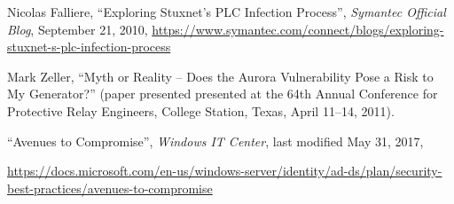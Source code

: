 \documentclass[10pt]{article}
\begin{document}
\begin{thebibliography}{9}
{    
    Nicolas Falliere, ``Exploring Stuxnet's PLC Infection Process'', \textit{Symantec Official Blog}, September 21, 2010, \url{https://www.symantec.com/connect/blogs/exploring-stuxnet-s-plc-infection-process}
    
    Mark Zeller, ``Myth or Reality – Does the Aurora Vulnerability Pose a Risk to My Generator?'' (paper presented presented at the 64th Annual Conference for Protective Relay Engineers, College Station, Texas, April 11–14, 2011). 
    
    ``Avenues to Compromise'', \textit{Windows IT Center}, last modified May 31, 2017, 
    
    \url{https://docs.microsoft.com/en-us/windows-server/identity/ad-ds/plan/security-best-practices/avenues-to-compromise}
    }
\end{thebibliography}
\end{document}
